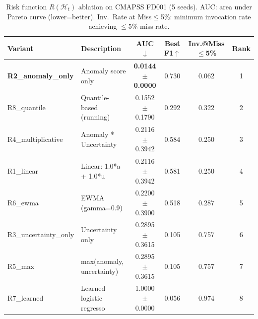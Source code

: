 \begin{table}[t]
\centering
\caption{Risk function $R(\mathcal{H}_t)$ ablation on CMAPSS FD001 (5 seeds). AUC: area under Pareto curve (lower=better). Inv.\ Rate at Miss$\leq$5\%: minimum invocation rate achieving $\leq$5\% miss rate.}
\label{tab:risk_ablation}
\begin{tabular}{llcccc}
\toprule
Variant & Description & AUC$\downarrow$ & Best F1$\uparrow$ & Inv.@Miss$\leq$5\% & Rank \\
\midrule
  \textbf{R2_anomaly_only} & Anomaly score only & \textbf{0.0144$\pm$0.0000} & 0.730 & 0.062 & 1 \\
  R8_quantile & Quantile-based (running) & 0.1552$\pm$0.1790 & 0.292 & 0.322 & 2 \\
  R4_multiplicative & Anomaly * Uncertainty & 0.2116$\pm$0.3942 & 0.584 & 0.250 & 3 \\
  R1_linear & Linear: 1.0*a + 1.0*u & 0.2116$\pm$0.3942 & 0.581 & 0.250 & 4 \\
  R6_ewma & EWMA (gamma=0.9) & 0.2200$\pm$0.3900 & 0.518 & 0.287 & 5 \\
  R3_uncertainty_only & Uncertainty only & 0.2895$\pm$0.3615 & 0.105 & 0.757 & 6 \\
  R5_max & max(anomaly, uncertainty) & 0.2895$\pm$0.3615 & 0.105 & 0.757 & 7 \\
  R7_learned & Learned logistic regresso & 1.0000$\pm$0.0000 & 0.056 & 0.974 & 8 \\
\bottomrule
\end{tabular}
\end{table}